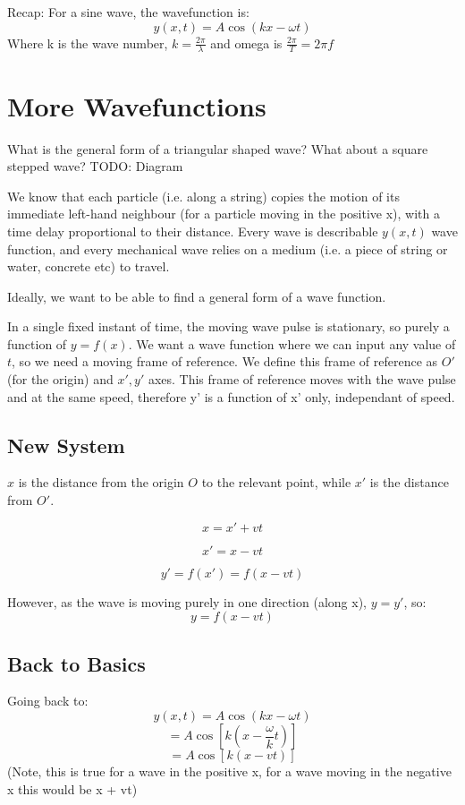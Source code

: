 \graphicspath{{figures/}}

Recap: For a sine wave, the wavefunction is:
\[
    y(x,t) = A \cos(kx - \omega t)
\]
Where k is the wave number, $k = \frac{2 \pi}{\lambda}$ and omega is $\frac{2 \pi}{T} = 2 \pi f$

\section*{More Wavefunctions}
What is the general form of a triangular shaped wave? What about a square stepped wave?
TODO: Diagram

We know that each particle (i.e. along a string) copies the motion of its immediate left-hand neighbour (for a particle moving in the positive x), with a time delay proportional to their distance. Every wave is describable $y(x,t)$ wave function, and every mechanical wave relies on a medium (i.e. a piece of string or water, concrete etc) to travel.

Ideally, we want to be able to find a general form of a wave function.

In a single fixed instant of time, the moving wave pulse is stationary, so purely a function of $y = f(x)$. We want a wave function where we can input any value of $t$, so we need a moving frame of reference. We define this frame of reference as $O'$ (for the origin) and $x', y'$ axes. This frame of reference moves with the wave pulse and at the same speed, therefore y' is a function of x' only, independant of speed.

\subsection*{New System}
$x$ is the distance from the origin $O$ to the relevant point, while $x'$ is the distance from $O'$.

\[
    x = x' + vt
\]

\[
    x' = x - vt
\]

\[
    y' = f(x') = f(x-vt)
\]

However, as the wave is moving purely in one direction (along x), $y = y'$, so:
\[
    y = f(x - vt)
\]


\subsection*{Back to Basics}
Going back to:
\[
    y(x,t) = A \cos(kx - \omega t)
\]
\[
    = A \cos\left[k\left(x - \frac{\omega}{k}t\right)\right]
\]
\[
    = A \cos\left[k\left(x - vt\right)\right]
\]
(Note, this is true for a wave in the positive x, for a wave moving in the negative x this would be x + vt)


